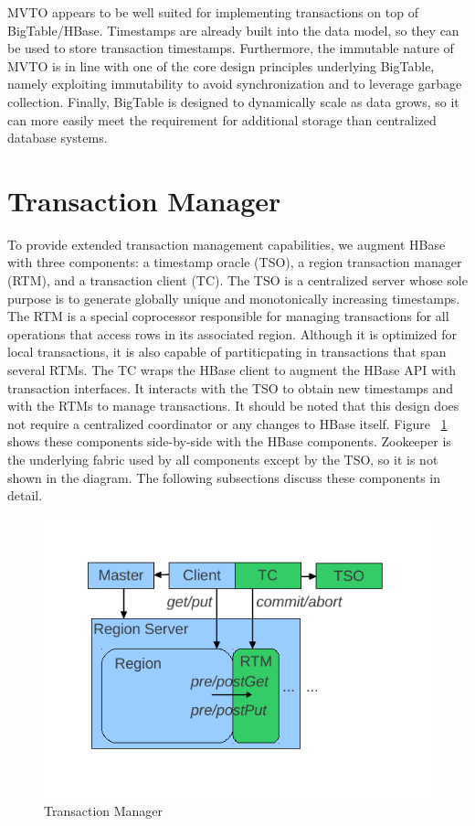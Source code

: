 \documentclass[10pt,final,journal]{IEEEtran}
\begin{document}
MVTO appears to be well suited for implementing transactions on top of BigTable/HBase. Timestamps are already built into the data model, so they can be used to store transaction timestamps. Furthermore, the immutable nature of MVTO is in line with one of the core design principles underlying BigTable, namely exploiting immutability to avoid synchronization and to leverage garbage collection. Finally, BigTable is designed to dynamically scale as data grows, so it can more easily meet the requirement for additional storage than centralized database systems.

\section{Transaction Manager}
To provide extended transaction management capabilities, we augment HBase with three components: a timestamp oracle (TSO), a region transaction manager (RTM), and a transaction client (TC). The TSO is a centralized server whose sole purpose is to generate globally unique and monotonically increasing timestamps. The RTM is a special coprocessor responsible for managing transactions for all operations that access rows in its associated region. Although it is optimized for local transactions, it is also capable of partiticpating in transactions that span several RTMs. The TC wraps the HBase client to augment the HBase API with transaction interfaces. It interacts with the TSO to obtain new timestamps and with the RTMs to manage transactions. It should be noted that this design does not require a centralized coordinator or any changes to HBase itself. Figure ~\ref{tm} shows these components side-by-side with the HBase components. Zookeeper is the underlying fabric used by all components except by the TSO, so it is not shown in the diagram. The following subsections discuss these components in detail.

\begin{figure}[!t]
\centering
\includegraphics{images/tm.pdf}
\caption{Transaction Manager}
\label{tm}
\end{figure}
\end{document}
